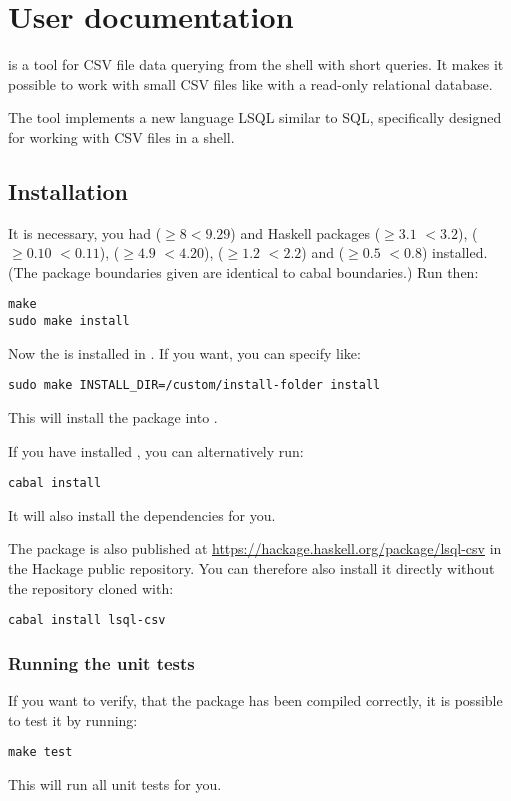 \chapter{User documentation}
 is a tool for CSV file data querying from the shell with short queries. It makes it possible to work with small CSV files like with a read-only relational database.

The tool implements a new language LSQL similar to SQL, specifically designed for working with CSV files in a shell. 

\section{Installation}
It is necessary, you had  ($\geq 8 <9.29$) and Haskell packages  ($\geq 3.1$ $<3.2$),  ($\geq 0.10$ $<0.11$), 
 ($\geq 4.9$ $<4.20$),  ($\geq 1.2$ $<2.2$) and  ($\geq 0.5$ $<0.8$)
 installed. (The package boundaries given are identical to cabal boundaries.) Run then:

\begin{verbatim}
make
sudo make install
\end{verbatim}

Now the  is installed in . If you want, you can specify  like:
\begin{verbatim}
sudo make INSTALL_DIR=/custom/install-folder install
\end{verbatim}
This will install the package into .

If you have installed , you can alternatively run:
\begin{verbatim}
cabal install
\end{verbatim}
It will also install the dependencies for you.

The package is also published at \url{https://hackage.haskell.org/package/lsql-csv} in the Hackage public repository. You can therefore also install it directly without the repository cloned with:
\begin{verbatim}
cabal install lsql-csv
\end{verbatim}

\subsection{Running the unit tests}
If you want to verify, that the package has been compiled correctly, it is possible to test it by running:
\begin{verbatim}
make test
\end{verbatim}
This will run all unit tests for you.

